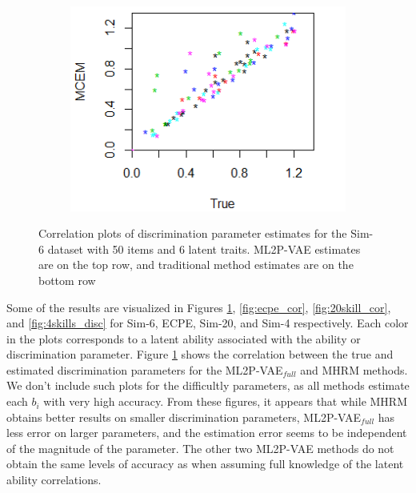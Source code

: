 \begin{figure}[h]
\begin{subfigure}{.32\textwidth}
    \end{subfigure}
    \begin{subfigure}{.32\textwidth}
      \centering
      \includegraphics[width=.9\linewidth]{img/ml_journal_results/6skills/mcem_disc_6skills.png}
    \end{subfigure}
    \caption{Correlation plots of discrimination parameter estimates for the Sim-6 dataset with 50 items and 6 latent traits. ML2P-VAE estimates are on the top row, and traditional method estimates are on the bottom row}
    \label{fig:6skill_cor}
\end{figure}

Some of the results are visualized in Figures \ref{fig:6skill_cor}, \ref{fig:ecpe_cor}, \ref{fig:20skill_cor}, and \ref{fig:4skills_disc} for Sim-6, ECPE, Sim-20, and Sim-4 respectively. Each color in the plots corresponds to a latent ability associated with the ability or discrimination parameter. Figure \ref{fig:6skill_cor} shows the correlation between the true and estimated discrimination parameters for the ML2P-VAE$_{full}$ and MHRM methods. We don't include such plots for the difficultly parameters, as all methods estimate each $b_i$ with very high accuracy. From these figures, it appears that while MHRM obtains better results on smaller discrimination parameters, ML2P-VAE$_{full}$ has less error on larger parameters, and the estimation error seems to be independent of the magnitude of the parameter. The other two ML2P-VAE methods do not obtain the same levels of accuracy as when assuming full knowledge of the latent ability correlations. 

